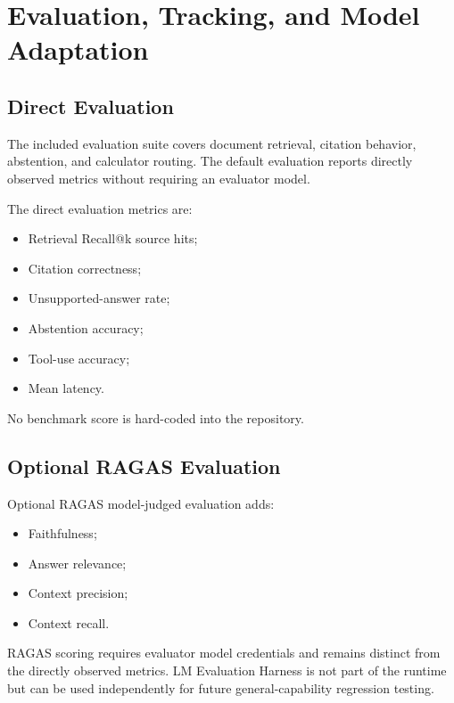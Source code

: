 
\section{Evaluation, Tracking, and Model Adaptation}

\subsection{Direct Evaluation}

The included evaluation suite covers document retrieval, citation behavior, abstention, and calculator routing. The default evaluation reports directly observed metrics without requiring an evaluator model.

The direct evaluation metrics are:

\begin{itemize}
\tightlist
\item
  Retrieval Recall@k source hits;
\item
  Citation correctness;
\item
  Unsupported-answer rate;
\item
  Abstention accuracy;
\item
  Tool-use accuracy;
\item
  Mean latency.
\end{itemize}

No benchmark score is hard-coded into the repository.

\subsection{Optional RAGAS Evaluation}

Optional RAGAS model-judged evaluation adds:

\begin{itemize}
\tightlist
\item
  Faithfulness;
\item
  Answer relevance;
\item
  Context precision;
\item
  Context recall.
\end{itemize}

RAGAS scoring requires evaluator model credentials and remains distinct from the directly observed metrics. LM Evaluation Harness is not part of the runtime but can be used independently for future general-capability regression testing.

